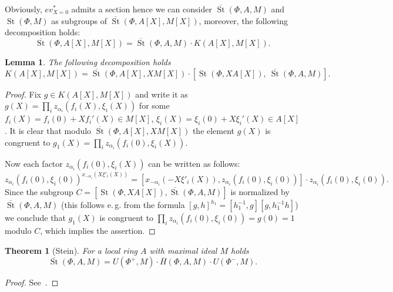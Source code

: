 \documentclass[oneside, 8pt]{amsart}
\newtheorem{theorem}{Theorem}
\newtheorem{lemma}{Lemma}
\theoremstyle{remark}
\theoremstyle{definition}
\DeclareMathOperator{\St}{St}
\numberwithin{equation}{section}
\begin{document}
Obviously, $ev_{X=0}^*$ admits a section hence we can consider $\overline{\St}(\Phi, A, M)$ and $\St(\Phi, M)$ as subgroups of $\overline{\St}(\Phi, A[X], M[X])$,
 moreover, the following decomposition holds:
\begin{equation} \label{relZero-decomp} \overline{\St}(\Phi, A[X], M[X]) = \overline{\St}(\Phi, A, M) \cdot K(A[X], M[X]).\end{equation}
\begin{lemma} 
The following decomposition holds
 \[ K(A[X], M[X]) = \overline{\St}(\Phi, A[X], XM[X]) \cdot \left[\St(\Phi, XA[X]),\ \overline{\St}(\Phi, A, M)\right].\] 
\end{lemma}
\begin{proof}
 Fix $g \in K(A[X], M[X])$ and write it as $g(X) = \prod_i z_{\alpha_i}(f_i(X), \xi_i(X))$ for some $f_i(X) = f_i(0) + Xf_i'(X) \in M[X]$, $\xi_i(X) = \xi_i(0) + X\xi_i'(X) \in A[X]$.
 It is clear that modulo $\overline{\St}(\Phi, A[X], XM[X])$ the element $g(X)$ is congruent to $g_1(X) = \prod_i z_{\alpha_i}(f_i(0), \xi_i(X)).$ 
 
 Now each factor $z_{\alpha_i}(f_i(0), \xi_i(X))$ can be written as follows:
 \[z_{\alpha_i}(f_i(0), \xi_i(0))^{x_{-\alpha_i}(X\xi'_i(X))} = [x_{-\alpha_i}(-X\xi'_i(X)), z_{\alpha_i}(f_i(0), \xi_i(0))] \cdot z_{\alpha_i}(f_i(0), \xi_i(0)).\]
 Since the subgroup $C = \left[\St(\Phi, XA[X]), \overline{\St}(\Phi, A, M)\right]$ is normalized by $\overline{\St}(\Phi, A, M)$ 
 (this follows e.\,g. from the formula $[g, h]^{h_1} = [h_1^{-1}, g][g, h_1^{-1}h]$) we conclude that $g_1(X)$ is congruent to $\prod_i z_{\alpha_i}(f_i(0), \xi_i(0)) = g(0) = 1$ modulo $C$,
 which implies the assertion. \qedhere
\end{proof}

\begin{theorem}[Stein] \label{thmStein} For a local ring $A$ with maximal ideal $M$ holds \[\overline{\St}(\Phi, A, M) = U(\Phi^+, M) \cdot \overline{H}(\Phi, A, M) \cdot U(\Phi^-, M).\] \end{theorem} \begin{proof} See~\cite[Theorem~2.4]{Ste73}. \end{proof}
\end{document}
